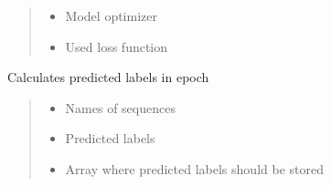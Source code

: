\documentclass[letterpaper,10pt,english]{sphinxmanual}
\begin{document}
\begin{fulllineitems}
\begin{fulllineitems}
\begin{quote}
\begin{description}
\begin{itemize}
\item {} 
\sphinxAtStartPar
{} \textendash{} Model optimizer

\item {} 
\sphinxAtStartPar
{} \textendash{} Used loss function

\end{itemize}

\end{description}\end{quote}

\end{fulllineitems}


\begin{fulllineitems}
\label{\detokenize{net:net.UVANEMO.__calc_total_labels}}
\pysigstartsignatures
{}
\pysigstopsignatures
\sphinxAtStartPar
Calculates predicted labels in epoch
\begin{quote}\begin{description}
\begin{itemize}
\item {} 
\sphinxAtStartPar
{} \textendash{} Names of sequences

\item {} 
\sphinxAtStartPar
{} \textendash{} Predicted labels

\item {} 
\sphinxAtStartPar
{} \textendash{} Array where predicted labels should be stored

\end{itemize}

\end{description}\end{quote}

\end{fulllineitems}



\end{fulllineitems}
\end{document}
